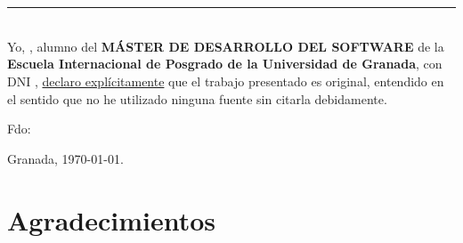 \chapter*{}
\thispagestyle{empty}

\noindent\rule[-1ex]{\textwidth}{2pt}\\[4.5ex]

Yo, \textbf{\estudiante}, alumno del \textbf{MÁSTER DE DESARROLLO DEL SOFTWARE} de la \textbf{Escuela Internacional de Posgrado de la Universidad de Granada}, con DNI \textbf{\dni}, \underline{declaro explícitamente} que el trabajo presentado es original, entendido en el sentido que no he utilizado ninguna fuente sin citarla debidamente.

\vspace{6cm}

\noindent Fdo: \textbf{\estudiante}

\vspace{2cm}

\begin{flushright}
Granada, \today.
\end{flushright}





\chapter*{Agradecimientos}
\thispagestyle{empty}

\vspace{1cm}



